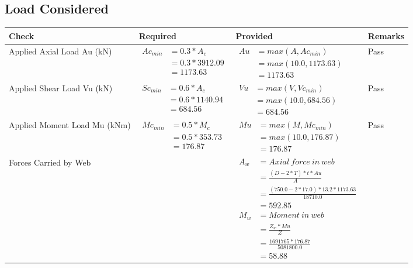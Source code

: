 \documentclass{article}%
\begin{document}
%
\subsection{Load Considered}%
\label{subsec:LoadConsidered}%
\renewcommand{\arraystretch}{1.2}%
\begin{longtable}{|p{4cm}|p{5cm}|p{5.5cm}|p{1.5cm}|}%
\hline%
\rowcolor{OsdagGreen}%
Check&Required&Provided&Remarks\\%
\hline%
\endhead%
\hline%
Applied Axial Load Au (kN)&$\begin{aligned} Ac_{min} &= 0.3 * A_c\\ &= 0.3 *3912.09\\ &=1173.63\end{aligned}$&$\begin{aligned} Au &= max(A,Ac_{min} )\\ &= max( 10.0,1173.63)\\ &=1173.63\end{aligned}$&Pass\\%
\hline%
Applied Shear Load Vu (kN)&$\begin{aligned} Sc_{min} &= 0.6 * A_c\\ &= 0.6 *1140.94\\ &=684.56\end{aligned}$&$\begin{aligned} Vu &= max(V,Vc_{min})\\ &=  max(10.0,684.56)\\ &=684.56\end{aligned}$&Pass\\%
\hline%
Applied Moment Load Mu (kNm)&$\begin{aligned} Mc_{min} &= 0.5 * M_c\\ &= 0.5 *353.73\\ &=176.87\end{aligned}$&$\begin{aligned} Mu &= max(M,Mc_{min} )\\ &= max(10.0,176.87)\\ &=176.87\end{aligned}$&Pass\\%
\hline%
Forces Carried by Web&&$\begin{aligned}A_w &= Axial~ force~ in~ web  \\   &= \frac{(D- 2*T)*t* Au }{A} \\ &= \frac{(750.0- 2*17.0)*13.2*1173.63 }{18710.0} \\ &=592.85\\ M_w &= Moment ~in ~web  \\  &= \frac{Z_w * Mu}{Z} \\ &= \frac{1691765 * 176.87}{5081800.0} \\ &=58.88\end{aligned}$&\\%

\end{longtable}
\end{document}
